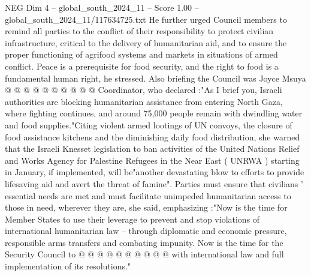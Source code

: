 \begin{textsample}{NEG Dim 4 – global\_south\_2024\_11 – Score 1.00 – global\_south\_2024\_11/117634725.txt}
He further urged Council members to remind all parties to the conflict of their responsibility to protect civilian infrastructure, critical to the delivery of humanitarian aid, and to ensure the proper functioning of agrifood systems and markets in situations of armed conflict.
Peace is a prerequisite for food security, and the right to food is a fundamental human right, he stressed.
Also briefing the Council was Joyce Msuya @ @ @ @ @ @ @ @ @ @ Coordinator, who declared :"As I brief you, Israeli authorities are blocking humanitarian assistance from entering North Gaza, where fighting continues, and around 75,000 people remain with dwindling water and food supplies."Citing violent armed lootings of UN convoys, the closure of food assistance kitchens and the diminishing daily food distribution, she warned that the Israeli Knesset legislation to ban activities of the United Nations Relief and Works Agency for Palestine Refugees in the Near East ( UNRWA ) starting in January, if implemented, will be"another devastating blow to efforts to provide lifesaving aid and avert the threat of famine".
Parties must ensure that civilians ' essential needs are met and must facilitate unimpeded humanitarian access to those in need, wherever they are, she said, emphasizing :"Now is the time for Member States to use their leverage to prevent and stop violations of international humanitarian law -- through diplomatic and economic pressure, responsible arms transfers and combating impunity.
Now is the time for the Security Council to @ @ @ @ @ @ @ @ @ @ with international law and full implementation of its resolutions."

\end{textsample}
